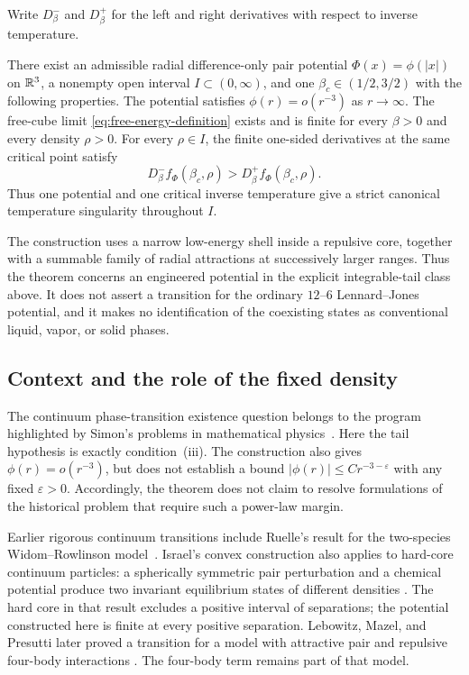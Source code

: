 Write $D_\beta^-$ and $D_\beta^+$ for the left and right derivatives
with respect to inverse temperature.

\begin{theorem}\label{thm:main}
There exist an admissible radial difference-only pair potential
$\Phi(x)=\phi(|x|)$ on $\mathbb R^3$, a nonempty open interval
$I\subset(0,\infty)$, and one $\beta_c\in(1/2,3/2)$ with the following
properties. The potential satisfies $\phi(r)=o(r^{-3})$ as $r\to\infty$.
The free-cube limit \eqref{eq:free-energy-definition} exists and is finite
for every $\beta>0$ and every density $\rho>0$. For every $\rho\in I$,
the finite one-sided derivatives at the same critical point satisfy
\[
 D_\beta^- f_\Phi(\beta_c,\rho)
 >D_\beta^+ f_\Phi(\beta_c,\rho).
\]
Thus one potential and one critical inverse temperature give a strict
canonical temperature singularity throughout $I$.
\end{theorem}

The construction uses a narrow low-energy shell inside a repulsive core,
together with a summable family of radial attractions at successively larger
ranges. Thus the theorem concerns an engineered potential in the explicit
integrable-tail class above. It does not assert a transition for the ordinary
$12$--$6$ Lennard--Jones potential, and it makes no identification of the
coexisting states as conventional liquid, vapor, or solid phases.

\subsection{Context and the role of the fixed density}
The continuum phase-transition existence question belongs to the program
highlighted by Simon's problems in mathematical physics~\cite{Simon1984}.
Here the tail hypothesis is exactly condition~(iii). The construction also
gives $\phi(r)=o(r^{-3})$, but does not establish a bound
$|\phi(r)|\le C r^{-3-\varepsilon}$ with any fixed $\varepsilon>0$.
Accordingly, the theorem does not claim to resolve formulations of the
historical problem that require such a power-law margin.

Earlier rigorous continuum transitions include Ruelle's result for the
two-species Widom--Rowlinson model~\cite{Ruelle1971}. Israel's convex
construction also applies to hard-core continuum particles: a
spherically symmetric pair perturbation and a chemical potential produce
two invariant equilibrium states of different densities
\cite[Section~6, Theorem~8(a)]{Israel1975}.
The hard core in that result excludes a positive interval of separations;
the potential constructed here is finite at every positive separation.
Lebowitz, Mazel, and Presutti later proved a transition for a model with
attractive pair and repulsive four-body interactions
\cite{LebowitzMazelPresutti1998,LebowitzMazelPresutti1999}.
The four-body term remains part of that model.

